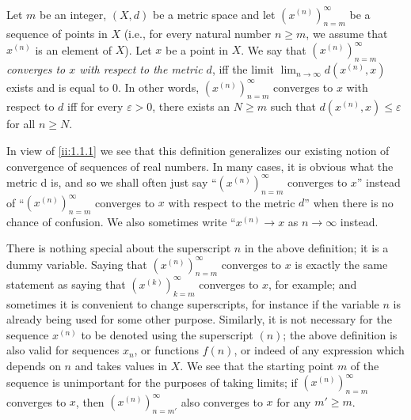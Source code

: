 \setcounter{thm}{13}
\begin{defn}\label{ii:1.1.14}
  Let \(m\) be an integer, \((X, d)\) be a metric space and let \((x^{(n)})_{n = m}^\infty\) be a sequence of points in \(X\)
  (i.e., for every natural number \(n \geq m\), we assume that \(x^{(n)}\) is an element of \(X\)).
  Let \(x\) be a point in \(X\).
  We say that \emph{\((x^{(n)})_{n = m}^\infty\) converges to \(x\) with respect to the metric \(d\)}, iff the limit \(\lim_{n \to \infty} d(x^{(n)}, x)\) exists and is equal to \(0\).
  In other words, \((x^{(n)})_{n = m}^\infty\) converges to \(x\) with respect to \(d\) iff for every \(\varepsilon > 0\), there exists an \(N \geq m\) such that \(d(x^{(n)}, x) \leq \varepsilon\) for all \(n \geq N\).
\end{defn}

\begin{rmk}\label{ii:1.1.15}
  In view of \cref{ii:1.1.1} we see that this definition generalizes our existing notion of convergence of sequences of real numbers.
  In many cases, it is obvious what the metric d is, and so we shall often just say ``\((x^{(n)})_{n = m}^\infty\) converges to \(x\)'' instead of ``\((x^{(n)})_{n = m}^\infty\) converges to \(x\) with respect to the metric \(d\)'' when there is no chance of confusion.
  We also sometimes write ``\(x^{(n)} \to x\) as \(n \to \infty\) instead.
\end{rmk}

\begin{rmk}\label{ii:1.1.16}
  There is nothing special about the superscript \(n\) in the above definition;
  it is a dummy variable.
  Saying that \((x^{(n)})_{n = m}^\infty\) converges to \(x\) is exactly the same statement as saying that \((x^{(k)})_{k = m}^\infty\) converges to \(x\), for example;
  and sometimes it is convenient to change superscripts, for instance if the variable \(n\) is already being used for some other purpose.
  Similarly, it is not necessary for the sequence \(x^{(n)}\) to be denoted using the superscript \((n)\);
  the above definition is also valid for sequences \(x_n\), or functions \(f(n)\), or indeed of any expression which depends on \(n\) and takes values in \(X\).
  We see that the starting point \(m\) of the sequence is unimportant for the purposes of taking limits;
  if \((x^{(n)})_{n = m}^\infty\) converges to \(x\), then \((x^{(n)})_{n = m'}^\infty\) also converges to \(x\) for any \(m' \geq m\).
\end{rmk}

